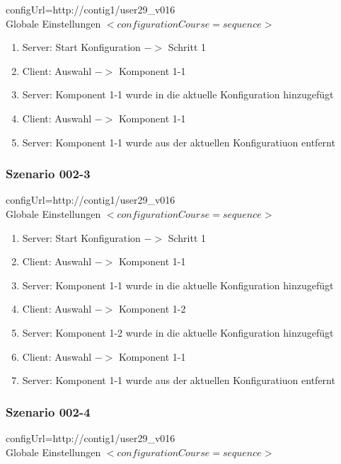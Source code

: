 \documentclass{article}
\begin{document}
configUrl=http://contig1/user29\_v016\\

Globale Einstellungen $<configurationCourse=sequence>$

\begin{enumerate}
  \item Server: Start Konfiguration $->$ Schritt 1
  \item Client: Auswahl $->$ Komponent 1-1
  \item Server: Komponent 1-1 wurde in die aktuelle Konfiguration hinzugef\"ugt
  \item Client: Auswahl $->$ Komponent 1-1
  \item Server: Komponent 1-1 wurde aus der aktuellen Konfiguratiuon entfernt
\end{enumerate}

\subsubsection{Szenario 002-3}

configUrl=http://contig1/user29\_v016\\

Globale Einstellungen $<configurationCourse=sequence>$

\begin{enumerate}
  \item Server: Start Konfiguration $->$ Schritt 1
  \item Client: Auswahl $->$ Komponent 1-1
  \item Server: Komponent 1-1 wurde in die aktuelle Konfiguration hinzugef\"ugt
  \item Client: Auswahl $->$ Komponent 1-2
  \item Server: Komponent 1-2 wurde in die aktuelle Konfiguration hinzugef\"ugt
  \item Client: Auswahl $->$ Komponent 1-1
  \item Server: Komponent 1-1 wurde aus der aktuellen Konfiguratiuon entfernt
\end{enumerate}

\subsubsection{Szenario 002-4}

configUrl=http://contig1/user29\_v016\\

Globale Einstellungen $<configurationCourse=sequence>$
\end{document}
